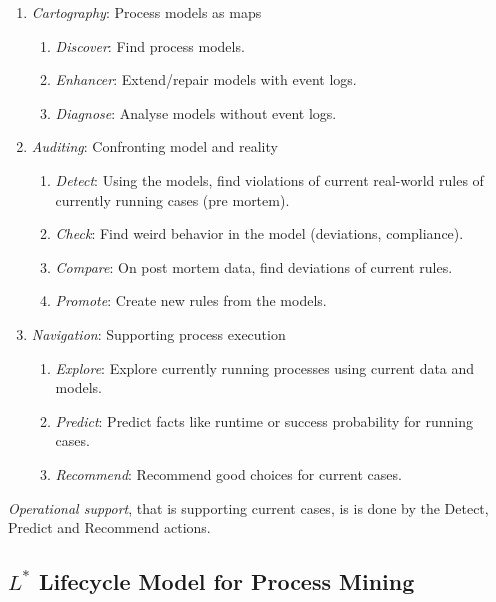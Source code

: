\documentclass[english]{panikzettel}
\begin{document}
\begin{enumerate}
    \item \emph{Cartography}: Process models as maps
        \begin{enumerate}
            \item \emph{Discover}: Find process models.
            \item \emph{Enhancer}: Extend/repair models with event logs.
            \item \emph{Diagnose}: Analyse models without event logs.
        \end{enumerate}
    \item \emph{Auditing}: Confronting model and reality
        \begin{enumerate}
            \item \emph{Detect}: Using the models, find violations of current real-world rules of currently running cases (pre mortem).
            \item \emph{Check}: Find weird behavior in the model (deviations, compliance).
            \item \emph{Compare}: On post mortem data, find deviations of current rules.
            \item \emph{Promote}: Create new rules from the models.
        \end{enumerate}
    \item \emph{Navigation}: Supporting process execution
        \begin{enumerate}
            \item \emph{Explore}: Explore currently running processes using current data and models.
            \item \emph{Predict}: Predict facts like runtime or success probability for running cases.
            \item \emph{Recommend}: Recommend good choices for current cases.
        \end{enumerate}
\end{enumerate}

\emph{Operational support}, that is supporting current cases, is is done by the Detect, Predict and Recommend actions.

\subsection[L* Lifecycle for Process Mining]{$L^\ast$ Lifecycle Model for Process Mining}
\end{document}
